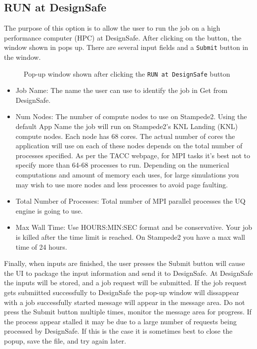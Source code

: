 \subsection{RUN at DesignSafe}
The purpose of this option is to allow the user to run the job on a high performance computer (HPC) at DesignSafe. After clicking on the button, the window shown in  pops up. There are several input fields and a \texttt{Submit} button in the window. 

\begin{figure}[!htbp]
  \caption{Pop-up window shown after clicking the \texttt{RUN at DesignSafe} button}
  \label{fig:remote_button}
\end{figure}

\begin{itemize}
\item Job Name: The name the user can use to identify the job in Get from DesignSafe.
\item Num Nodes: The number of compute nodes to use on Stampede2. Using the default App Name the job will run on Stampede2’s KNL Landing (KNL) 
compute nodes. Each node has 68 cores. The actual number of cores the
application will use on each of these nodes depends on the total
number of processes specified. As per the TACC webpage, for MPI tasks
it’s best not to specify more than 64-68 processes to run. Depending
on the numerical computations and amount of memory each uses, for large simulations you may wish to use more nodes and less processes to
avoid page faulting.
\item Total Number of Processes: Total number of MPI parallel processes the UQ engine is going to use.
\item Max Wall Time: Use HOURS:MIN:SEC format and be conservative. Your job is killed after the time limit is reached. On Stampede2 you have a max wall time of 24 hours.
\end{itemize}

Finally, when inputs are finished, the user presses the Submit button will cause the UI to 
package the input information and send it to DesignSafe. At DesignSafe the inputs will be 
stored, and a job request will be submitted. If the job request gets submiitted successfully 
to DesignSafe the pop-up window will dissappear with a job successfully started message 
will appear in the message area. Do not press the Submit button multiple times, monitor 
the message area for progress. If the process appear stalled it may be due to a large number 
of requests being processed by DesignSafe. If this is the case it is sometimes best to close 
the popup, save the file, and try again later.

